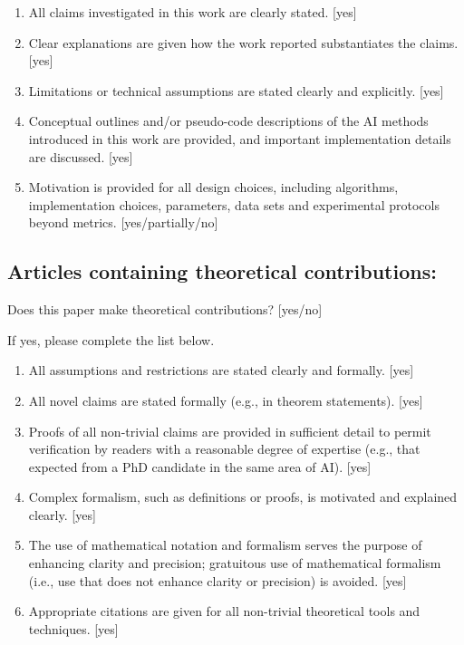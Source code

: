 \documentclass[manuscript, screen, review]{jair}
\begin{document}
\begin{enumerate}
    \item All claims investigated in this work are clearly stated. 
    [yes]
    \item Clear explanations are given how the work reported substantiates the claims. 
    [yes]
    \item Limitations or technical assumptions are stated clearly and explicitly. 
    [yes]
    \item Conceptual outlines and/or pseudo-code descriptions of the AI methods introduced in this work are provided, and important implementation details are discussed. 
    [yes]
    \item 
    Motivation is provided for all design choices, including algorithms, implementation choices, parameters, data sets and experimental protocols beyond metrics.
    [yes/partially/no]
\end{enumerate}

\subsection*{Articles containing theoretical contributions:}
Does this paper make theoretical contributions? 
[yes/no] 

If yes, please complete the list below.

\begin{enumerate}
    \item All assumptions and restrictions are stated clearly and formally. 
    [yes]
    \item All novel claims are stated formally (e.g., in theorem statements). 
    [yes]
    \item Proofs of all non-trivial claims are provided in sufficient detail to permit verification by readers with a reasonable degree of expertise (e.g., that expected from a PhD candidate in the same area of AI). [yes]
    \item
    Complex formalism, such as definitions or proofs, is motivated and explained clearly.
    [yes]
    \item 
    The use of mathematical notation and formalism serves the purpose of enhancing clarity and precision; gratuitous use of mathematical formalism (i.e., use that does not enhance clarity or precision) is avoided.
    [yes]
    \item 
    Appropriate citations are given for all non-trivial theoretical tools and techniques. 
    [yes]
\end{enumerate}
\end{document}
